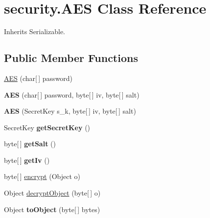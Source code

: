 \hypertarget{classsecurity_1_1_a_e_s}{
\section{security.\-A\-E\-S \-Class \-Reference}
\label{classsecurity_1_1_a_e_s}
}


\-Inherits \-Serializable.

\subsection*{\-Public \-Member \-Functions}
\begin{DoxyCompactItemize}
\item 
\hyperlink{classsecurity_1_1_a_e_s_af9b77a489f9dce9983f8c47e7639bc7e}{\-A\-E\-S} (char\mbox{[}$\,$\mbox{]} password)
\item 
\hypertarget{classsecurity_1_1_a_e_s_a391e29172f32a6276abc13b865aebf34}{
{\bfseries \-A\-E\-S} (char\mbox{[}$\,$\mbox{]} password, byte\mbox{[}$\,$\mbox{]} iv, byte\mbox{[}$\,$\mbox{]} salt)}
\label{classsecurity_1_1_a_e_s_a391e29172f32a6276abc13b865aebf34}

\item 
\hypertarget{classsecurity_1_1_a_e_s_a791ce9f3e39ce1594ca7b8da59d00a64}{
{\bfseries \-A\-E\-S} (\-Secret\-Key s\-\_\-k, byte\mbox{[}$\,$\mbox{]} iv, byte\mbox{[}$\,$\mbox{]} salt)}
\label{classsecurity_1_1_a_e_s_a791ce9f3e39ce1594ca7b8da59d00a64}

\item 
\hypertarget{classsecurity_1_1_a_e_s_a0cb5565c55858f26c83f19078de3f318}{
\-Secret\-Key {\bfseries get\-Secret\-Key} ()}
\label{classsecurity_1_1_a_e_s_a0cb5565c55858f26c83f19078de3f318}

\item 
\hypertarget{classsecurity_1_1_a_e_s_ac2dba28588f0a2daec9248468ee704ec}{
byte\mbox{[}$\,$\mbox{]} {\bfseries get\-Salt} ()}
\label{classsecurity_1_1_a_e_s_ac2dba28588f0a2daec9248468ee704ec}

\item 
\hypertarget{classsecurity_1_1_a_e_s_a35817b279daac3d1be5d8de937d7cdba}{
byte\mbox{[}$\,$\mbox{]} {\bfseries get\-Iv} ()}
\label{classsecurity_1_1_a_e_s_a35817b279daac3d1be5d8de937d7cdba}

\item 
byte\mbox{[}$\,$\mbox{]} \hyperlink{classsecurity_1_1_a_e_s_a8d8ffab5f79011a2c66d2eb4b7800b4d}{encrypt} (\-Object o)
\item 
\-Object \hyperlink{classsecurity_1_1_a_e_s_ae6fd6a4ba186cb1234d7845ded747ff9}{decrypt\-Object} (byte\mbox{[}$\,$\mbox{]} o)
\item 
\hypertarget{classsecurity_1_1_a_e_s_a1e6633d286929d0d7d339c6dcac44ed1}{
\-Object {\bfseries to\-Object} (byte\mbox{[}$\,$\mbox{]} bytes)}
\label{classsecurity_1_1_a_e_s_a1e6633d286929d0d7d339c6dcac44ed1}


\end{DoxyCompactItemize}
